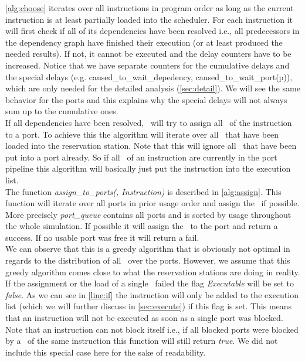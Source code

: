 \autoref{alg:choose} iterates over all instructions in program order as long as the current instruction is at least partially loaded into the scheduler. For each instruction it will first check if all of its dependencies have been resolved i.e., all predecessors in the dependency graph have finished their execution (or at least produced the needed results). If not, it cannot be executed and the delay counters have to be increased. Notice that we have separate counters for the cumulative delays and the special delays (e.g. caused\_to\_wait\_depedency, caused\_to\_wait\_port(p)), which are only needed for the detailed analysis (\autoref{sec:detail}). We will see the same behavior for the ports and this explains why the special delays will not always sum up to the cumulative ones.\\
If all dependencies have been resolved, \suaca\ will try to assign all \microops\ of the instruction to a port. To achieve this the algorithm will iterate over all \microops\ that have been loaded into the reservation station. Note that this will ignore all \microops\ that have been put into a port already. So if all \microops\ of an instruction are currently in the port pipeline this algorithm will basically just put the instruction into the execution list.\\ 
The function \emph{assign\_to\_ports(\microop, Instruction)} is described in \autoref{alg:assign}. This function will iterate over all ports in prior usage order and assign the \microop\ if possible. More precisely \emph{port\_queue} contains all ports and is sorted by usage throughout the whole simulation. If possible it will assign the \microop\ to the port and return a success. If no usable port was free it will return a fail.\\
We can observe that this is a greedy algorithm that is obviously not optimal in regards to the distribution of all \microops\ over the ports. However, we assume that this greedy algorithm comes close to what the reservation stations are doing in reality.\\
If the assignment or the load of a single \microop\ failed the flag \emph{Executable} will be set to \emph{false}. As we can see in \autoref{line:if} the instruction will only be added to the execution list (which we will further discuss in \autoref{sec:execute}) if this flag is set. This means that an instruction will not be executed as soon as a single port was blocked. Note that an instruction can not block itself i.e., if all blocked ports were blocked by a \microop\ of the same instruction this function will still return \emph{true}. We did not include this special case here for the sake of readability.\\

